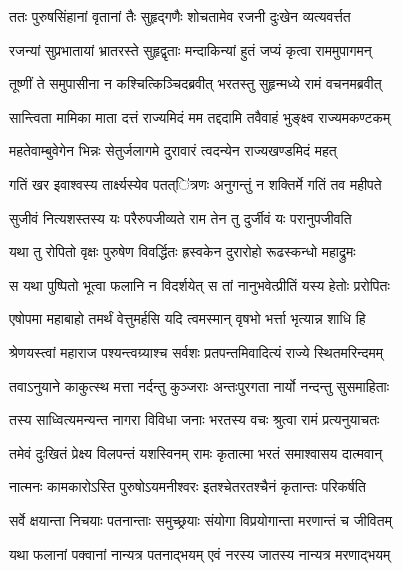 
\twolineshloka
{ततः पुरुषसिंहानां वृतानां तैः सुहृद्गणैः}
{शोचतामेव रजनी दुःखेन व्यत्यवर्त्तत} %

\twolineshloka
{रजन्यां सुप्रभातायां भ्रातरस्ते सुहृद्वृताः}
{मन्दाकिन्यां हुतं जप्यं कृत्वा राममुपागमन्} %

\twolineshloka
{तूष्णीं ते समुपासीना न कश्चित्किञ्चिदब्रवीत्}
{भरतस्तु सुहृन्मध्ये रामं वचनमब्रवीत्} %

\twolineshloka
{सान्त्विता मामिका माता दत्तं राज्यमिदं मम}
{तद्ददामि तवैवाहं भुङ्क्ष्व राज्यमकण्टकम्} %

\twolineshloka
{महतेवाम्बुवेगेन भिन्नः सेतुर्जलागमे}
{दुरावारं त्वदन्येन राज्यखण्डमिदं महत्} %

\twolineshloka
{गतिं खर इवाश्वस्य तार्क्ष्यस्येव पतत्ऺित्रणः}
{अनुगन्तुं न शक्तिर्मे गतिं तव महीपते} %

\twolineshloka
{सुजीवं नित्यशस्तस्य यः परैरुपजीव्यते}
{राम तेन तु दुर्जीवं यः परानुपजीवति} %

\twolineshloka
{यथा तु रोपितो वृक्षः पुरुषेण विवर्द्धितः}
{ह्रस्वकेन दुरारोहो रूढस्कन्धो महाद्रुमः} %

\twolineshloka
{स यथा पुष्पितो भूत्वा फलानि न विदर्शयेत्}
{स तां नानुभवेत्प्रीतिं यस्य हेतोः प्ररोपितः} %

\twolineshloka
{एषोपमा महाबाहो तमर्थं वेत्तुमर्हसि}
{यदि त्वमस्मान् वृषभो भर्त्ता भृत्यान्न शाधि हि} %

\twolineshloka
{श्रेणयस्त्वां महाराज पश्यन्त्वग्र्याश्च सर्वशः}
{प्रतपन्तमिवादित्यं राज्ये स्थितमरिन्दमम्} %

\twolineshloka
{तवाऽनुयाने काकुत्स्थ मत्ता नर्दन्तु कुञ्जराः}
{अन्तःपुरगता नार्यो नन्दन्तु सुसमाहिताः} %

\twolineshloka
{तस्य साध्वित्यमन्यन्त नागरा विविधा जनाः}
{भरतस्य वचः श्रुत्वा रामं प्रत्यनुयाचतः} %

\twolineshloka
{तमेवं दुःखितं प्रेक्ष्य विलपन्तं यशस्विनम्}
{रामः कृतात्मा भरतं समाश्वासय दात्मवान्} %

\twolineshloka
{नात्मनः कामकारोऽस्ति पुरुषोऽयमनीश्वरः}
{इतश्चेतरतश्चैनं कृतान्तः परिकर्षति} %

\twolineshloka
{सर्वे क्षयान्ता निचयाः पतनान्ताः समुच्छ्रयाः}
{संयोगा विप्रयोगान्ता मरणान्तं च जीवितम्} %

\twolineshloka
{यथा फलानां पक्वानां नान्यत्र पतनाद्भयम्}
{एवं नरस्य जातस्य नान्यत्र मरणाद्भयम्} %

